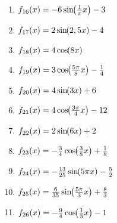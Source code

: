 \begin{Exercise}[title={\raggedright\normalfont Bestimme jeweils die erste und zweite Ableitung}, label=trigAbleitungA1]
\begin{minipage}{\textwidth}
{\begin{minipage}{0.5\linewidth}
\begin{enumerate}[label=\alph*)]
					\item \(f_{16}(x)=-6\sinn{\frac{1}{\pi}x}-3\)
					\item \(f_{17}(x)=2\sinn{2,5x}-4\)
					\item \(f_{18}(x)=4\coss{8x}\)
					\item \(f_{19}(x)=3\coss{\frac{5\pi}{8}x}-\frac{1}{4}\)
					\item \(f_{20}(x)=4\sinn{3x}+6\)
					\item \(f_{21}(x)=4\coss{\frac{3\pi}{4}x}-12\)
					\item \(f_{22}(x)=2\sinn{6x}+2\)
					\item \(f_{23}(x)=-\frac{3}{4}\coss{\frac{3}{8}x}+\frac{1}{8}\)
					\item \(f_{24}(x)=-\frac{13}{25}\sinn{5\pi x}-\frac{5}{2}\)
					\item \(f_{25}(x)=\frac{6}{35}\sinn{\frac{5\pi}{3}x}+\frac{8}{3}\)
					\item \(f_{26}(x)=-\frac{9}{4}\coss{\frac{1}{3}x}-1\)
				\end{enumerate}
		\end{minipage}}
	\end{minipage}
\end{Exercise}

